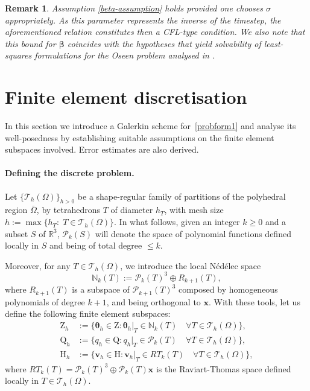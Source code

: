 \documentclass[reqno,a4paper]{article}
\numberwithin{equation}{section}
\newcommand\bv{\boldsymbol{v}}
\newcommand\bx{\boldsymbol{x}}
\newcommand\bbbeta{\boldsymbol{\beta}}
\newcommand\cP{\mathcal{P}}
\newcommand\cT{\mathcal{T}}
\newcommand\N{\mathbb{N}}
\newcommand\R{\mathbb{R}}
\renewcommand\O{\Omega}
\renewcommand\H{\mathrm{H}}
\newcommand\Q{\mathrm{Q}}
\newcommand\Z{\mathrm{Z}}
\newcommand\btheta{\boldsymbol{\theta}}
\newtheorem{remark}{Remark}[section]
\begin{document}
\begin{remark}
Assumption \eqref{beta-assumption} 
holds provided one chooses $\sigma$ appropriately. As this parameter represents 
the inverse of the timestep, the aforementioned relation constitutes then a CFL-type condition. We also note that this  
bound for $\bbbeta$ coincides with the hypotheses that yield solvability of least-squares 
formulations for the Oseen problem analysed in \cite{chang07,cai16}.
\end{remark}



\section{Finite element discretisation} \label{sec:FE}
In this section we introduce a Galerkin scheme
for~\eqref{probform1} and analyse its well-posedness
by establishing suitable assumptions on the finite
element subspaces involved. Error estimates are also derived. 

\paragraph{Defining the discrete problem.}
Let $\{\cT_{h}(\O)\}_{h>0}$ be a shape-regular
family of partitions of the polyhedral region
$\bar\O$, by tetrahedrons $T$ of diameter $h_T$, with mesh size
$h:=\max\{h_T:\; T\in\cT_{h}(\O)\}$.
In what follows, given an integer $k\ge0$ and a subset
$S$ of $\R^3$, $\cP_k(S)$ will denote the space of polynomial functions
defined locally in $S$ and being of total degree $\leq k$. 

Moreover, for any $T\in\cT_{h}(\O)$, we introduce the local N\'ed\'elec space
$$\N_k(T):=\cP_{k}(T)^3\oplus R_{k+1}(T),$$ 
where $R_{k+1}(T)$ is a subspace of $\cP_{k+1}(T)^3$ composed by
homogeneous polynomials of degree $k+1$, and being orthogonal to $\bx$. With 
these tools, let us 
define the following finite element subspaces:
%
\begin{align}
\Z_h&:=\{\btheta_h\in\Z: \btheta_h|_T\in\N_k(T)\quad\forall T\in\cT_{h}(\O)\},\label{space1}\\
\Q_h&:=\{q_h\in\Q: q_h|_T\in\cP_{k}(T)\quad\forall T\in\cT_{h}(\O)\},\label{space2}\\
\H_h&:=\{\bv_h \in \H: \bv_h|_{T} \in RT_{k}(T)\quad\forall T\in \cT_h(\O) \},\label{space3}
\end{align}
where 
$RT_k(T)=\cP_{k}(T)^3\oplus\cP_{k}(T)\bx$ is the Raviart-Thomas space defined locally in $T\in \cT_h(\Omega)$. 
\end{document}
